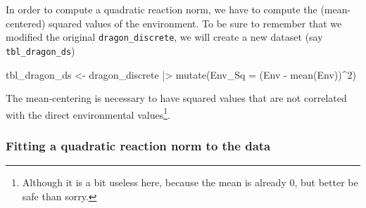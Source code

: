 \documentclass[a4paper,12pt,twoside]{article}
\begin{document}
In order to compute a quadratic reaction norm, we have to compute the (mean-centered) squared values of the environment. To be sure to remember that we modified the original \texttt{dragon\_discrete}, we will create a new dataset (say \texttt{tbl\_dragon\_ds})
\begin{Rinput}
tbl_dragon_ds <-
    dragon_discrete |>
    mutate(Env_Sq = (Env - mean(Env))^2)
\end{Rinput}
The mean-centering is necessary to have squared values that are not correlated with the direct environmental values\footnote{Although it is a bit useless here, because the mean is already 0, but better be safe than sorry.}.

\subsubsection{Fitting a quadratic reaction norm to the data}
\label{subsubsec_agr_ds_model}
\end{document}

